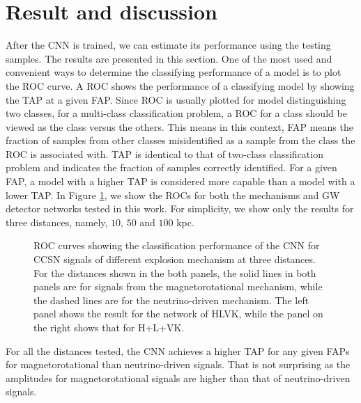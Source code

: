 \documentclass[aps,twocolumn,showpacs,groupedaddress, nofootinbib]{revtex4}  %
\begin{document}
\section{Result and discussion}\label{sec:result}
After the \ac{CNN} is trained, we can estimate its performance using the testing samples.
The results are presented in this section.
One of the most used and convenient ways to determine the classifying performance of a model is to plot the \ac{ROC} curve.
A \ac{ROC} shows the performance of a classifying model by showing the \ac{TAP} at a given \ac{FAP}. 
Since \ac{ROC} is usually plotted for model distinguishing two classes, 
for a multi-class classification problem, 
a \ac{ROC} for a class should be viewed as the class versus the others.
This means in this context, \ac{FAP} means the fraction of samples from other 
classes misidentified as a sample from the class the \ac{ROC} is associated with.
\ac{TAP} is identical to that of two-class classification problem and indicates the fraction of samples correctly identified.
For a given \ac{FAP}, a model with a higher \ac{TAP} is considered more capable than a model with a lower \ac{TAP}.
In Figure \ref{fig:ROClog}, we show the \acp{ROC} for both the mechanisms and \ac{GW} detector networks tested in this work. 
For simplicity, we show only the results for three distances, namely, $10$, $50$ and $100$ kpc.
\begin{figure}
     \begin{center}
%
        \quad
%
    \end{center}
    \caption{ROC curves showing the classification performance of the \ac{CNN} for \ac{CCSN} signals of different explosion mechanism at three distances.
For the distances shown in the both panels, the solid lines in both panels are for signals from the magnetorotational mechanism, 
while the dashed lines are for the neutrino-driven mechanism. 
The left panel shows the result for the network of HLVK, while the panel on the right shows that for 
H+L+VK.
\label{fig:ROClog}}%
\end{figure}
For all the distances tested, the \ac{CNN} achieves a higher \ac{TAP} for any given \acp{FAP} 
for magnetorotational than neutrino-driven signals.
That is not surprising as the amplitudes for magnetorotational signals are higher than that of neutrino-driven signals.
\end{document}
